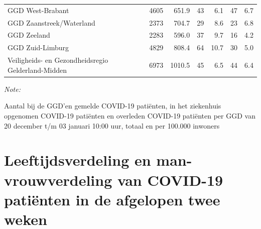 \documentclass[
  english,
  man,floatsintext]{apa6}
\begin{document}
\begin{table}[H]
\begin{threeparttable}
\begin{tabular}{lrrrrrr}
GGD West-Brabant & 4605 & 651.9 & 43 & 6.1 & 47 & 6.7\\
GGD Zaanstreek/Waterland & 2373 & 704.7 & 29 & 8.6 & 23 & 6.8\\
GGD Zeeland & 2283 & 596.0 & 37 & 9.7 & 16 & 4.2\\
GGD Zuid-Limburg & 4829 & 808.4 & 64 & 10.7 & 30 & 5.0\\
Veiligheids- en Gezondheidsregio Gelderland-Midden & 6973 & 1010.5 & 45 & 6.5 & 44 & 6.4\\
\bottomrule
\end{tabular}
\begin{tablenotes}
\item \textit{Note: } 
\item Aantal bij de GGD’en gemelde COVID-19 patiënten, in het ziekenhuis opgenomen COVID-19 patiënten en overleden COVID-19 patiënten per GGD van 20 december t/m 03 januari 10:00 uur, totaal en per 100.000 inwoners
\end{tablenotes}
\end{threeparttable}
\endgroup{}
\end{table}

\newpage

\hypertarget{leeftijdsverdeling-en-man-vrouwverdeling-van-covid-19-patiuxebnten-in-de-afgelopen-twee-weken}{%
\section{Leeftijdsverdeling en man-vrouwverdeling van COVID-19 patiënten in de afgelopen twee weken}\label{leeftijdsverdeling-en-man-vrouwverdeling-van-covid-19-patiuxebnten-in-de-afgelopen-twee-weken}}
\end{document}
